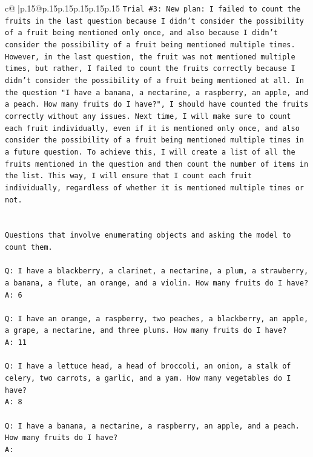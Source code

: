\documentclass{article}
\begin{document}
{\begin{supertabular}{c@{$\;$}|p{.15\linewidth}@{}p{.15\linewidth}p{.15\linewidth}p{.15\linewidth}p{.15\linewidth}p{.15\linewidth}}
{{{\texttt{Trial \#3: New plan: I failed to count the fruits in the last question because I didn't consider the possibility of a fruit being mentioned only once, and also because I didn't consider the possibility of a fruit being mentioned multiple times. However, in the last question, the fruit was not mentioned multiple times, but rather, I failed to count the fruits correctly because I didn't consider the possibility of a fruit being mentioned at all. In the question "I have a banana, a nectarine, a raspberry, an apple, and a peach. How many fruits do I have?", I should have counted the fruits correctly without any issues. Next time, I will make sure to count each fruit individually, even if it is mentioned only once, and also consider the possibility of a fruit being mentioned multiple times in a future question. To achieve this, I will create a list of all the fruits mentioned in the question and then count the number of items in the list. This way, I will ensure that I count each fruit individually, regardless of whether it is mentioned multiple times or not.} \\
\\ 
\\ 
\texttt{Questions that involve enumerating objects and asking the model to count them.} \\
\\ 
\texttt{Q: I have a blackberry, a clarinet, a nectarine, a plum, a strawberry, a banana, a flute, an orange, and a violin. How many fruits do I have?} \\
\texttt{A: 6} \\
\\ 
\texttt{Q: I have an orange, a raspberry, two peaches, a blackberry, an apple, a grape, a nectarine, and three plums. How many fruits do I have?} \\
\texttt{A: 11} \\
\\ 
\texttt{Q: I have a lettuce head, a head of broccoli, an onion, a stalk of celery, two carrots, a garlic, and a yam. How many vegetables do I have?} \\
\texttt{A: 8} \\
\\ 
\texttt{Q: I have a banana, a nectarine, a raspberry, an apple, and a peach. How many fruits do I have?} \\
\texttt{A:} \\
            }
        }
    }
     \\ \\


\end{supertabular}}
\end{document}
